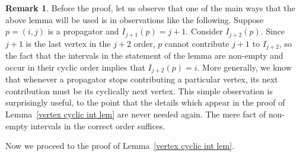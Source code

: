 \documentclass[11pt]{article}
\theoremstyle{remark}
\theoremstyle{definition}
\newtheorem{rmk}[thm]{Remark}
\begin{document}
\begin{rmk}\label{rmk cyclic}
  Before the proof, let us observe that one of the main ways that the above lemma will be used is in observations like the following.  Suppose $p=(i,j)$ is a propagator and $I_{j+1}(p) = j+1$.  Consider $I_{j+2}(p)$.  Since $j+1$ is the last vertex in the $j+2$ order, $p$ cannot contribute $j+1$ to $I_{j+2}$, so the fact that the intervals in the statement of the lemma are non-empty and occur in their cyclic order implies that $I_{j+2}(p)=i$.  More generally, we know that whenever a propagator stops contributing a particular vertex, its next contribution must be its cyclically next vertex.  This simple observation is surprisingly useful, to the point that the details which appear in the proof of Lemma~\ref{vertex cyclic int lem} are never needed again.  The mere fact of non-empty intervals in the correct order suffices.
\end{rmk}
  
Now we proceed to the proof of Lemma~\ref{vertex cyclic int lem}.
\end{document}
